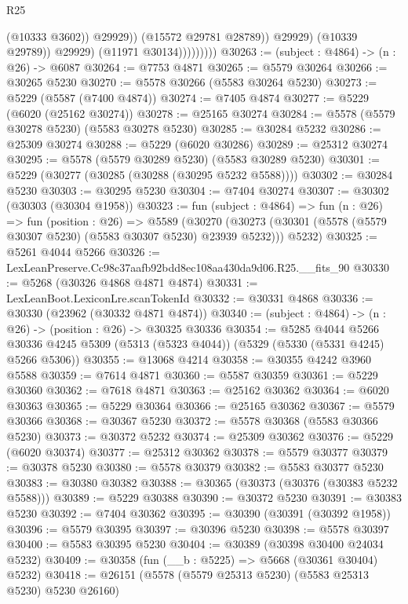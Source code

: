 \begin{lexlean}{R25}
\begin{coremodule}
                                  (@10333 @3602))
                                @29929))
                            (@15572 @29781 @28789))
                          @29929)
                        (@10339 @29789))
                      @29929)
                    (@11971 @30134)))))))))
@30263 := (subject : @4864) -> (n : @26) -> @6087
@30264 := @7753 @4871
@30265 := @5579 @30264
@30266 := @30265 @5230
@30270 := @5578 @30266 (@5583 @30264 @5230)
@30273 := @5229 (@5587 (@7400 @4874))
@30274 := @7405 @4874
@30277 := @5229 (@6020 (@25162 @30274))
@30278 := @25165 @30274
@30284 := @5578 (@5579 @30278 @5230) (@5583 @30278 @5230)
@30285 := @30284 @5232
@30286 := @25309 @30274
@30288 := @5229 (@6020 @30286)
@30289 := @25312 @30274
@30295 := @5578 (@5579 @30289 @5230) (@5583 @30289 @5230)
@30301 := @5229 (@30277 (@30285 (@30288 (@30295 @5232 @5588))))
@30302 := @30284 @5230
@30303 := @30295 @5230
@30304 := @7404 @30274
@30307 := @30302 (@30303 (@30304 @1958))
@30323 := fun (subject : @4864) =>
  fun (n : @26) =>
  fun (position : @26) =>
  @5589
    (@30270 (@30273 (@30301 (@5578 (@5579 @30307 @5230) (@5583 @30307 @5230) @23939 @5232))) @5232)
@30325 := @5261 @4044 @5266
@30326 := LexLeanPreserve.Cc98c37aafb92bdd8ec108aa430da9d06.R25.__fits_90
@30330 := @5268 (@30326 @4868 @4871 @4874)
@30331 := LexLeanBoot.LexiconLre.scanTokenId
@30332 := @30331 @4868
@30336 := @30330 (@23962 (@30332 @4871 @4874))
@30340 := (subject : @4864) -> (n : @26) -> (position : @26) -> @30325 @30336
@30354 := @5285
    @4044
    @5266
    @30336
    @4245
    @5309
    (@5313 (@5323 @4044))
    (@5329 (@5330 (@5331 @4245) @5266 @5306))
@30355 := @13068 @4214
@30358 := @30355 @4242 @3960 @5588
@30359 := @7614 @4871
@30360 := @5587 @30359
@30361 := @5229 @30360
@30362 := @7618 @4871
@30363 := @25162 @30362
@30364 := @6020 @30363
@30365 := @5229 @30364
@30366 := @25165 @30362
@30367 := @5579 @30366
@30368 := @30367 @5230
@30372 := @5578 @30368 (@5583 @30366 @5230)
@30373 := @30372 @5232
@30374 := @25309 @30362
@30376 := @5229 (@6020 @30374)
@30377 := @25312 @30362
@30378 := @5579 @30377
@30379 := @30378 @5230
@30380 := @5578 @30379
@30382 := @5583 @30377 @5230
@30383 := @30380 @30382
@30388 := @30365 (@30373 (@30376 (@30383 @5232 @5588)))
@30389 := @5229 @30388
@30390 := @30372 @5230
@30391 := @30383 @5230
@30392 := @7404 @30362
@30395 := @30390 (@30391 (@30392 @1958))
@30396 := @5579 @30395
@30397 := @30396 @5230
@30398 := @5578 @30397
@30400 := @5583 @30395 @5230
@30404 := @30389 (@30398 @30400 @24034 @5232)
@30409 := @30358 (fun (__b : @5225) => @5668 (@30361 @30404) @5232)
@30418 := @26151 (@5578 (@5579 @25313 @5230) (@5583 @25313 @5230) @5230 @26160)

\end{coremodule}
\end{lexlean}
